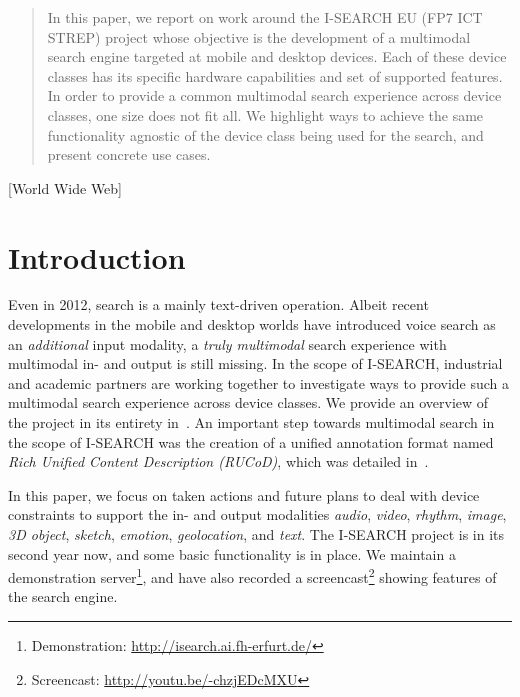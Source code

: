 \documentclass{acm_proc_article-sp}
\let\oldemph\emph
\renewcommand{\emph}[1]{\oldemph{\fontsize{9}{9}\selectfont #1}}
\newcommand{\inlinelistingsize}{\fontsize{8pt}{11pt}}
\let\oldurl\url
\renewcommand{\url}[1]{\inlinelistingsize\oldurl{#1}}
\begin{document}
\begin{abstract}
In this paper, we report on work around the \mbox{I-SEARCH} EU (FP7 ICT STREP) project whose objective is the development of a multimodal search engine targeted at mobile and desktop devices.
Each of these device classes has its specific hardware capabilities and set of supported features.
In order to provide a common multimodal search experience across device classes, one size does not fit all.
We highlight ways to achieve the same functionality agnostic of the device class being used for the search, and present concrete use cases.
\end{abstract}

[World Wide Web]


\section{Introduction} \label{sec:introduction}
Even in 2012, search is a mainly text-driven operation.
Albeit recent developments in the mobile and desktop worlds have introduced voice search as an \emph{additional} input modality, a \emph{truly multimodal} search experience with multimodal in- and output is still missing.
In the scope of \mbox{I-SEARCH}, industrial and academic partners are working together to investigate ways to provide such a multimodal search experience across device classes.
We provide an overview of the project in its entirety in~\cite{www2012}.
An important step towards multimodal search in the scope of \mbox{I-SEARCH} was the creation of a unified annotation format named \emph{Rich Unified Content Description (RUCoD)}, which was detailed in~\cite{ijmis2010}.

In this paper, we focus on taken actions and future plans to deal with device constraints to support the in- and output modalities \emph{audio}, \emph{video}, \emph{rhythm}, \emph{image}, \emph{3D object}, \emph{sketch}, \emph{emotion}, \emph{geolocation}, and \emph{text}.
The \mbox{I-SEARCH} project is in its second year now, and some basic functionality is in place.
We maintain a demonstration server\footnote{Demonstration: \url{http://isearch.ai.fh-erfurt.de/}}, and have also recorded a screencast\footnote{Screencast: \url{http://youtu.be/-chzjEDcMXU}} showing features of the search engine.
\end{document}
